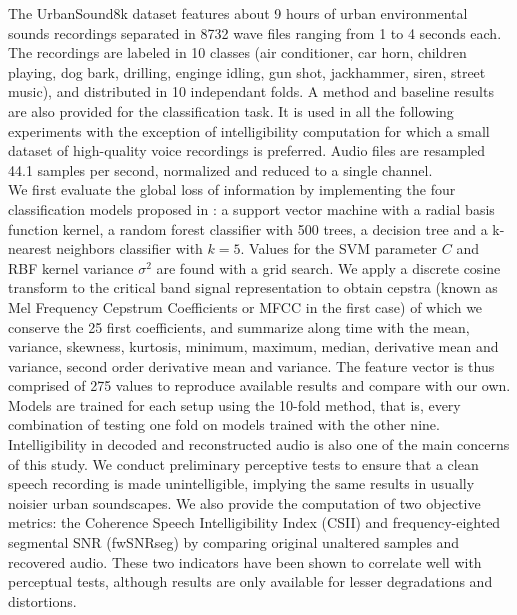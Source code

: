\documentclass[final,3p,times,twocolumn]{elsarticle}
\begin{document}
The UrbanSound8k dataset\cite{salamon2014} features about 9 hours of urban environmental sounds recordings separated in 8732 wave files ranging from 1 to 4 seconds each. The recordings are labeled in 10 classes (air conditioner, car horn, children playing, dog bark, drilling, enginge idling, gun shot, jackhammer, siren, street music), and distributed in 10 independant folds. A method and baseline results are also provided for the classification task. It is used in all the following experiments with the exception of intelligibility computation for which a small dataset of high-quality voice recordings is preferred. Audio files are resampled 44.1 samples per second, normalized and reduced to a single channel.\\

We first evaluate the global loss of information by implementing the four classification models proposed in \cite{salamon2014}: a support vector machine with a radial basis function kernel, a random forest classifier with 500 trees, a decision tree and a k-nearest neighbors classifier with $k = 5$. Values for the SVM parameter $C$ and RBF kernel variance $\sigma^2$ are found with a grid search. We apply a discrete cosine transform to the critical band signal representation to obtain cepstra (known as Mel Frequency Cepstrum Coefficients or MFCC in the first case) of which we conserve the 25 first coefficients, and summarize along time with the mean, variance, skewness, kurtosis, minimum, maximum, median, derivative mean and variance, second order derivative mean and variance. The feature vector is thus comprised of 275 values to reproduce available results and compare with our own. Models are trained for each setup using the 10-fold method, that is, every combination of testing one fold on models trained with the other nine.\\

Intelligibility in decoded and reconstructed audio is also one of the main concerns of this study. We conduct preliminary perceptive tests to ensure that a clean speech recording is made unintelligible, implying the same results in usually noisier urban soundscapes. We also provide the computation of two objective metrics: the Coherence Speech Intelligibility Index\cite{kates2005} (CSII) and frequency-eighted segmental SNR\cite{hu2008} (fwSNRseg) by comparing original unaltered samples and recovered audio. These two indicators have been shown to correlate well with perceptual tests\cite{ma2009}, although results are only available for lesser degradations and distortions.\\
\end{document}
